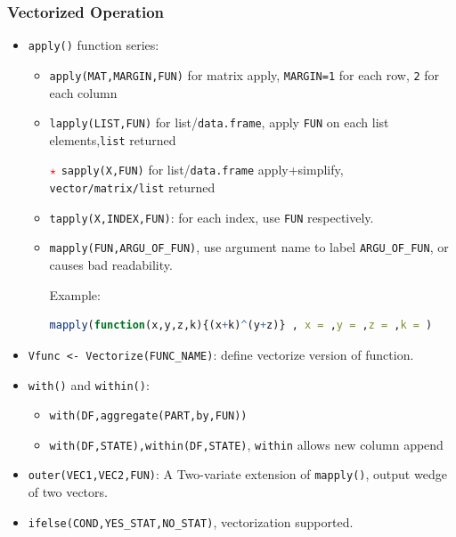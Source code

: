\subsubsection{Vectorized Operation}\label{SubSubSectionVectorizedOperation}
\begin{itemize}[topsep=2pt,itemsep=0pt]
    \item \lstinline|apply()| function series:
\begin{itemize}[topsep=2pt,itemsep=0pt]
    \item \lstinline|apply(MAT,MARGIN,FUN)| for matrix apply, \lstinline|MARGIN=1| for each row, \lstinline|2| for each column
    \item \lstinline|lapply(LIST,FUN)| for list/\lstinline|data.frame|, apply \lstinline|FUN| on each list elements,\lstinline|list| returned
    \item[$ \color{red}\star $] \lstinline|sapply(X,FUN)| for list/\lstinline|data.frame| apply+simplify, \lstinline|vector/matrix/list| returned
    \item \lstinline|tapply(X,INDEX,FUN)|: for each index, use \lstinline|FUN| respectively.
    \item \lstinline|mapply(FUN,ARGU_OF_FUN)|, use argument name to label \lstinline|ARGU_OF_FUN|, or causes bad readability. 
    
    Example:
\begin{lstlisting}[language=R]
mapply(function(x,y,z,k){(x+k)^(y+z)} , x = ,y = ,z = ,k = )
\end{lstlisting}
    \end{itemize}

    \item \lstinline|Vfunc <- Vectorize(FUNC_NAME)|: define vectorize version of function.
    \item \lstinline|with()| and \lstinline|within()|:
    \begin{itemize}[topsep=2pt,itemsep=0pt]
         \item \lstinline|with(DF,aggregate(PART,by,FUN))|
        \item \lstinline|with(DF,STATE),within(DF,STATE)|,
     \lstinline|within| allows new column append
    \end{itemize}
    \item \lstinline|outer(VEC1,VEC2,FUN)|: A Two-variate extension of \lstinline|mapply()|, output wedge of two vectors.
    \item \lstinline|ifelse(COND,YES_STAT,NO_STAT)|, vectorization supported.
\end{itemize}





